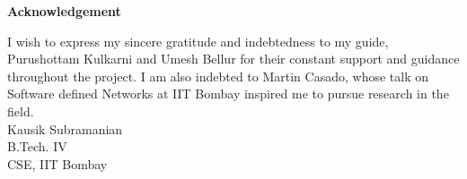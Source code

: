 \begin{center}
{\large \bfseries
Acknowledgement
}~\\[1cm]
\end{center}
\begin{flushleft}
{
I wish to express my sincere gratitude and indebtedness to my guide, \\Purushottam Kulkarni and Umesh Bellur for their constant support and guidance throughout the project. I am also indebted to Martin Casado, whose talk on Software defined Networks at IIT Bombay inspired me to pursue research in the field. 
}~\\[1.5cm]
{
Kausik Subramanian\\
B.Tech. IV\\
CSE, IIT Bombay
}
\end{flushleft}
